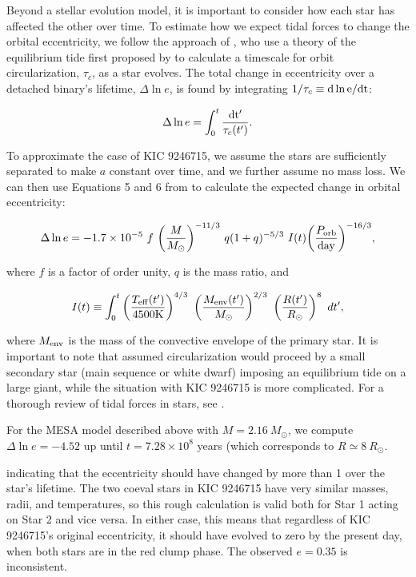 Beyond a stellar evolution model, it is important to consider how each star has affected the other over time. To estimate how we expect tidal forces to change the orbital eccentricity, we follow the approach of \citet{ver95}, who use a theory of the equilibrium tide first proposed by \citet{zah77} to calculate a timescale for orbit circularization, $\tau_c$, as a star evolves. The total change in eccentricity over a detached binary's lifetime, $\Delta \ln e$, is found by integrating $1/\tau_c \equiv \rm{d} \ln e / \rm{d}t$:

\begin{equation}\label{circ}
\Delta \ln e = \int_0^t \frac{\rm{d}t'}{\tau_c(t')}.
\end{equation}

To approximate the case of KIC 9246715, we assume the stars are sufficiently separated to make $a$ constant over time, and we further assume no mass loss. We can then use Equations 5 and 6 from \citet{ver95} to calculate the expected change in orbital eccentricity:

\begin{equation}\label{tide1}
\Delta \ln e = -1.7 \times 10^{-5} \ f \ {\left( \frac{M}{M_{\odot}} \right)}^{-11/3} \ q(1+q)^{-5/3} \ I(t) {\left( \frac{P_{\rm{orb}}}{\rm{day}} \right)}^{-16/3},
\end{equation}

where $f$ is a factor of order unity, $q$ is the mass ratio, and

\begin{equation}
I(t) \equiv \int_0^t \left( \frac{T_{\rm{eff}}(t')}{4500 \rm{K}} \right)^{4/3} \ \left( \frac{M_{\rm{env}}(t')}{M_{\odot}} \right)^{2/3} \ \left( \frac{R(t')}{R_{\odot}} \right)^8 \ dt',
\end{equation}

where $M_{\rm{env}}$ is the mass of the convective envelope of the primary star. It is important to note that \citet{ver95} assumed circularization would proceed by a small secondary star (main sequence or white dwarf) imposing an equilibrium tide on a large giant, while the situation with KIC 9246715 is more complicated. For a thorough review of tidal forces in stars, see \citet{ogi14}.

For the MESA model described above with $M = 2.16 \ M_{\odot}$, we compute $\Delta \ln e = -4.52$ up until $t = 7.28 \times 10^8$ years (which corresponds to $R \simeq 8 \ R_{\odot}$.

indicating that the eccentricity should have changed by more than 1 over the star's lifetime. The two coeval stars in KIC 9246715 have very similar masses, radii, and temperatures, so this rough calculation is valid both for Star 1 acting on Star 2 and vice versa. In either case, this means that regardless of KIC 9246715's original eccentricity, it should have evolved to zero by the present day, when both stars are in the red clump phase. The observed $e = 0.35$ is inconsistent.

